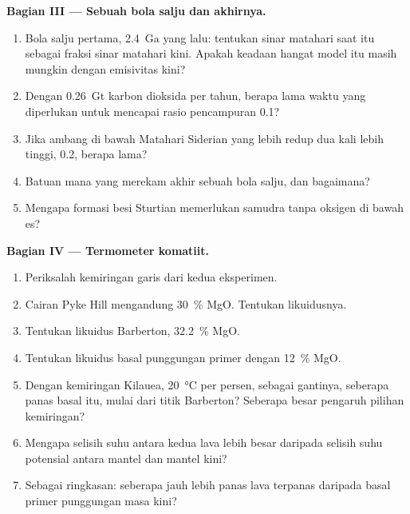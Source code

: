 \begin{problem}
\noindent\textbf{Bagian III --- Sebuah bola salju dan akhirnya.}
\begin{enumerate}[resume]
  \item Bola salju pertama, \qty{2.4}{Ga} yang lalu: tentukan sinar matahari saat itu sebagai fraksi sinar matahari kini.
        Apakah keadaan hangat model itu masih mungkin dengan emisivitas kini?
  \item Dengan \qty{0.26}{Gt} karbon dioksida per tahun, berapa lama waktu yang diperlukan untuk mencapai rasio
        pencampuran 0.1?
  \item Jika ambang di bawah Matahari Siderian yang lebih redup dua kali lebih tinggi, 0.2, berapa lama?
  \item Batuan mana yang merekam akhir sebuah bola salju, dan bagaimana?
  \item Mengapa formasi besi Sturtian memerlukan samudra tanpa oksigen di bawah es?
\end{enumerate}

\noindent\textbf{Bagian IV --- Termometer komatiit.}
\begin{enumerate}[resume]
  \item Periksalah kemiringan garis  dari kedua eksperimen.
  \item Cairan  Pyke Hill mengandung \qty{30}{\percent} MgO. Tentukan likuidusnya.
  \item Tentukan likuidus  Barberton, \qty{32.2}{\percent} MgO.
  \item Tentukan likuidus basal punggungan primer dengan \qty{12}{\percent} MgO.
  \item Dengan kemiringan Kilauea, \qty{20}{\celsius} per persen, sebagai gantinya, seberapa panas
        basal itu, mulai dari titik Barberton? Seberapa besar pengaruh pilihan kemiringan?
  \item Mengapa selisih suhu antara kedua lava lebih besar daripada selisih
        suhu potensial antara mantel  dan mantel kini?
  \item Sebagai ringkasan: seberapa jauh lebih panas lava   terpanas daripada basal primer
        punggungan masa kini?
\end{enumerate}
\end{problem}
